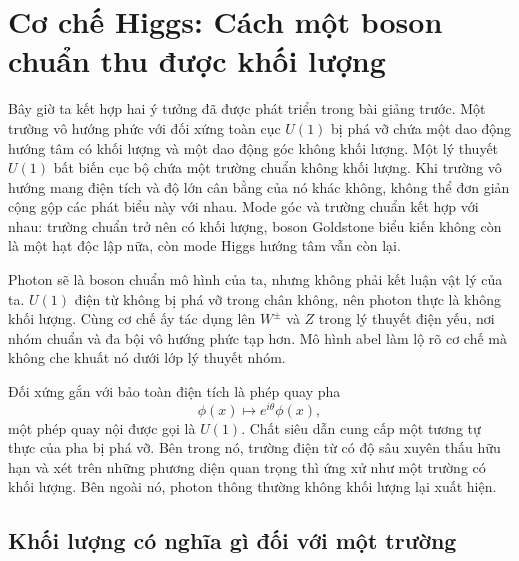 \chapter{Cơ chế Higgs: Cách một boson chuẩn thu được khối lượng}

Bây giờ ta kết hợp hai ý tưởng đã được phát triển trong bài giảng trước. Một trường vô hướng phức với đối xứng toàn cục \(U(1)\) bị phá vỡ chứa một dao động hướng tâm có khối lượng và một dao động góc không khối lượng. Một lý thuyết \(U(1)\) bất biến cục bộ chứa một trường chuẩn không khối lượng. Khi trường vô hướng mang điện tích và độ lớn cân bằng của nó khác không, không thể đơn giản cộng gộp các phát biểu này với nhau. Mode góc và trường chuẩn kết hợp với nhau: trường chuẩn trở nên có khối lượng, boson Goldstone biểu kiến không còn là một hạt độc lập nữa, còn mode Higgs hướng tâm vẫn còn lại.

Photon sẽ là boson chuẩn mô hình của ta, nhưng không phải kết luận vật lý của ta. \(U(1)\) điện từ không bị phá vỡ trong chân không, nên photon thực là không khối lượng. Cùng cơ chế ấy tác dụng lên \(W^\pm\) và \(Z\) trong lý thuyết điện yếu, nơi nhóm chuẩn và đa bội vô hướng phức tạp hơn. Mô hình abel làm lộ rõ cơ chế mà không che khuất nó dưới lớp lý thuyết nhóm.

\begin{classroomqa}
\end{classroomqa}

Đối xứng gắn với bảo toàn điện tích là phép quay pha
\begin{equation}
  \phi(x)\longmapsto e^{i\theta}\phi(x),
\end{equation}
một phép quay nội được gọi là \(U(1)\). Chất siêu dẫn cung cấp một tương tự thực của pha bị phá vỡ. Bên trong nó, trường điện từ có độ sâu xuyên thấu hữu hạn và xét trên những phương diện quan trọng thì ứng xử như một trường có khối lượng. Bên ngoài nó, photon thông thường không khối lượng lại xuất hiện.

\section{Khối lượng có nghĩa gì đối với một trường}

